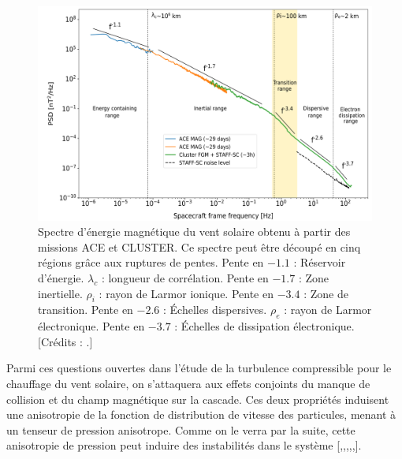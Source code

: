 \begin{figure}[!ht]
 \centering
\includegraphics[width=\linewidth,trim=0.5cm 0cm 0cm 0cm, clip=true]{./Part_0/images/spectre_SW}
\cprotect\caption{Spectre d'énergie magnétique du vent solaire obtenu à partir des missions \acs{ACE} et \acs{CLUSTER}. Ce spectre peut être découpé en cinq régions grâce aux ruptures de pentes. Pente en $-1.1$ : Réservoir d'énergie. $\lambda_c$ : longueur de corrélation. Pente en $-1.7$ : Zone inertielle. $\rho_i$ : rayon de Larmor ionique. Pente en $-3.4$ : Zone de transition. Pente en $-2.6$ : Échelles dispersives. $\rho_e$ : rayon de Larmor électronique. Pente en $-3.7$ : Échelles de dissipation électronique. [Crédits : \cite{sahraoui_magnetohydrodynamic_2020}.]}
\label{fig:spectre_SW}
\end{figure}

Parmi ces questions ouvertes dans l'étude de la turbulence compressible pour le chauffage du vent solaire, on s'attaquera aux effets conjoints du manque de collision et du champ magnétique sur la cascade. Ces deux propriétés induisent une anisotropie de la fonction de distribution de vitesse des particules, menant à un tenseur de pression anisotrope. Comme on le verra par la suite, cette anisotropie de pression peut induire des instabilités dans le système [\cite{parker_dynamical_1958},\cite{berezin_firehose_1976},\cite{hall_firehose_1981},\cite{southwood_mirror_1993},\cite{gary_proton_1976},\cite{hunana_introductory_2019}]. 

